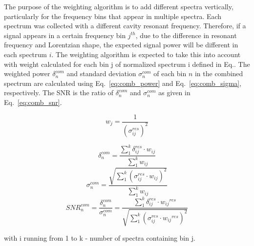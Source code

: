 The purpose of the weighting algorithm is to add different spectra vertically, particularly for the frequency bins that appear in multiple spectra.  %
Each spectrum was collected with a different cavity resonant frequency. Therefore, if a signal appears in a certain frequency bin $j^{th}$, due to the difference in resonant frequency and Lorentzian shape, the expected signal power will be different in each spectrum $i$. The weighting algorithm is expected to take this into account with weight calculated for each bin j of normalized spectrum i defined in Eq.\cite{eq:weight}.
The weighted power $\delta^{com}_{n}$ and standard deviation $\sigma^{com}_{n}$ of each bin $n$ in the combined spectrum are calculated using Eq.~\ref{eq:comb_power} and Eq.~\ref{eq:comb_sigma}, respectively. The SNR is the ratio of $\delta^{com}_{n}$ and $\sigma^{com}_{n}$ as given in Eq.~\ref{eq:comb_snr}.


\begin{equation}
    \label{eq:weight}
    {w_{j}} = \frac{1}{(\sigma_{ij}^{res})^{2}}
\end{equation}

\begin{equation}
    \label{eq:comb_power}
    \delta_{n}^{com} = \frac{ \sum_{1}^{k}\delta_{ij}^{res} \cdot {w_{ij}}}{\sum_{1}^{k} {w_{ij}}}
\end{equation}
\begin{equation}
    \label{eq:comb_sigma}
    \sigma_{n}^{com} = \frac{ \sqrt{\sum_{1}^{k}(\sigma_{ij}^{res} \cdot {w_{ij}})^2}}{\sum_{1}^{k} {w_{ij}}}
\end{equation}
\begin{equation}
    \label{eq:comb_snr}
    {SNR}_{n}^{com} = \frac{\delta^{com}_{n}}{\sigma^{com}_{n}}= \frac{\sum_{1}^{k}\delta_{ij}^{res} \cdot {w_{ij}}^{res}}{ \sqrt{\sum_{1}^{k}(\sigma_{ij}^{res} \cdot {w_{ij}}^{res})^2}}
\end{equation}

with i running from 1 to k - number of spectra containing bin j.

